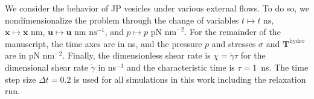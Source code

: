 \documentclass[lineno]{jfm}
\newcommand{\xx}{\mathbf{x}}
\newcommand{\uu}{\mathbf{u}}
\begin{document}
We consider the behavior of JP vesicles under various external flows.
To do so, we nondimensionalize the problem through the change of
variables 
$t \mapsto t \text{ ns},$ %
$\xx \mapsto \xx \text{ nm}$, %
$\uu \mapsto \uu \text{ nm ns}^{-1}$, and %
$p \mapsto p \text{ pN nm}^{-2}$.
For the remainder of the manuscript, the time axes are in ns, and the
pressure $p$ and stresses $\sigma$ and $\mathbf{T}^{\mathrm{hydro}}$ are
in pN nm$^{-2}$. Finally, the dimensionless shear rate is $\chi =
\dot\gamma \tau$ for the dimensional shear rate $\dot\gamma$ in
ns$^{-1}$ and the characteristic time is $\tau = 1$~ns. The time step
size $\Delta t=0.2$ is used for all simulations in this work including
the relaxation run.
\end{document}
